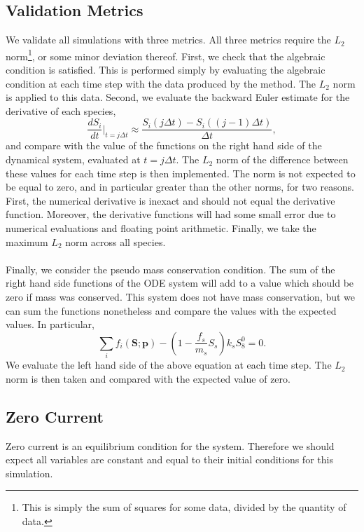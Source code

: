 \documentclass[11pt,twoside,a4paper]{article}
\begin{document}
\subsection{Validation Metrics}\label{subsec:metrics}
We validate all simulations with three metrics. All three metrics require the $L_2$ norm\footnote{This is simply the sum of squares for some data, divided by the quantity of data.}, or some minor deviation thereof. First, we check that the algebraic condition is satisfied. This is performed simply by evaluating the algebraic condition at each time step with the data produced by the method. The $L_2$ norm is applied to this data.  Second, we evaluate the backward Euler estimate for the derivative of each species, 
%
\begin{equation}
\frac{dS_i}{dt}\Bigg|_{t = j\Delta t} \approx \frac{S_i(j\Delta t)-S_i((j-1)\Delta t)}{\Delta t},
\end{equation}
%
and compare with the value of the functions on the right hand side of the dynamical system, evaluated at $t = j\Delta t$. The $L_2$ norm of the difference between these values for each time step is then implemented. The norm is not expected to be equal to zero, and in particular greater than the other norms, for two reasons. First, the numerical derivative is inexact and should not equal the derivative function. Moreover, the derivative functions will had some small error due to numerical evaluations and floating point arithmetic. Finally, we take the maximum $L_2$ norm across all species. \\ \\
Finally, we consider the pseudo mass conservation condition. The sum of the right hand side functions of the ODE system will add to a value which should be zero if mass was conserved. This system does not have mass conservation, but we can sum the functions nonetheless and compare the values with the expected values. In particular, 
%
\begin{equation}
\sum_i f_i(\boldsymbol{S};\boldsymbol{p}) - \left(1-\frac{f_s}{m_s}S_s\right)k_sS_8^0 = 0.
\end{equation}
%
We evaluate the left hand side of the above equation at each time step. The $L_2$ norm is then taken and compared with the expected value of zero. 

\subsection{Zero Current}
Zero current is an equilibrium condition for the system. Therefore we should expect all variables are constant and equal to their initial conditions for this simulation. 
\end{document}
